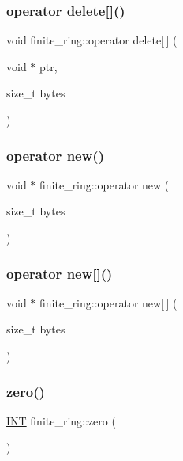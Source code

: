 \subsubsection{\texorpdfstring{operator delete[]()}{operator delete[]()}}
{\footnotesize\ttfamily void finite\+\_\+ring\+::operator delete\mbox{[}$\,$\mbox{]} (\begin{DoxyParamCaption}\item[{void $\ast$}]{ptr,  }\item[{size\+\_\+t}]{bytes }\end{DoxyParamCaption})}

\mbox{\label{classfinite__ring_a95828bc9149d5c6bf360fcec825f8b21}} 
\subsubsection{\texorpdfstring{operator new()}{operator new()}}
{\footnotesize\ttfamily void $\ast$ finite\+\_\+ring\+::operator new (\begin{DoxyParamCaption}\item[{size\+\_\+t}]{bytes }\end{DoxyParamCaption})}

\mbox{\label{classfinite__ring_adefd70790e2fb148d980dadc54af0628}} 
\subsubsection{\texorpdfstring{operator new[]()}{operator new[]()}}
{\footnotesize\ttfamily void $\ast$ finite\+\_\+ring\+::operator new\mbox{[}$\,$\mbox{]} (\begin{DoxyParamCaption}\item[{size\+\_\+t}]{bytes }\end{DoxyParamCaption})}

\mbox{\label{classfinite__ring_ab258d71de0aef4797d83ff0d98bec144}} 
\subsubsection{\texorpdfstring{zero()}{zero()}}
{\footnotesize\ttfamily \mbox{\hyperlink{galois_8h_a09fddde158a3a20bd2dcadb609de11dc}{I\+NT}} finite\+\_\+ring\+::zero (\begin{DoxyParamCaption}{ }\end{DoxyParamCaption})}



